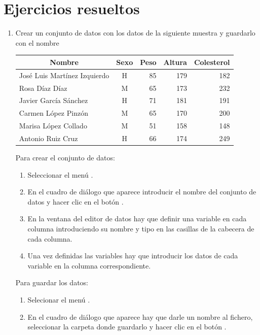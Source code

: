 \section{Ejercicios resueltos}
\begin{enumerate}[leftmargin=*]
\item Crear un conjunto de datos con los datos de la siguiente muestra y guardarlo con el nombre
\begin{center}
\begin{tabular}{|l|c|r|r|r|}
\hline
\multicolumn{1}{|c|}{Nombre} & \multicolumn{1}{c|}{Sexo} & \multicolumn{1}{c|}{Peso} & \multicolumn{1}{c|}{Altura} & \multicolumn{1}{c|}{Colesterol}\\
\hline
José Luis Martínez Izquierdo  & H &  85 & 179 & 182\\
Rosa Díaz Díaz & M & 65 & 173 & 232\\
Javier García Sánchez  & H & 71 & 181 & 191\\
Carmen López Pinzón & M &  65 & 170 & 200\\
Marisa López Collado & M &  51 & 158 & 148\\
Antonio Ruiz Cruz & H & 66 & 174 & 249\\
\hline
\end{tabular}
\end{center}

\begin{indicacion}{Para crear el conjunto de datos:
\begin{enumerate}
\item Seleccionar el menú .
\item En el cuadro de diálogo que aparece introducir el nombre del conjunto de datos  y hacer clic en el botón .
\item En la ventana del editor de datos hay que definir una variable en cada columna introduciendo su nombre y tipo en las casillas de la cabecera de cada columna.
\item Una vez definidas las variables hay que introducir los datos de cada variable en la columna correspondiente. 
\end{enumerate}
Para guardar los datos:
\begin{enumerate}
\item Selecionar el menú .
\item En el cuadro de diálogo que aparece hay que darle un nombre al fichero, seleccionar la carpeta donde guardarlo y hacer clic en el
botón .
\end{enumerate}
}
\end{indicacion}


\end{enumerate}
